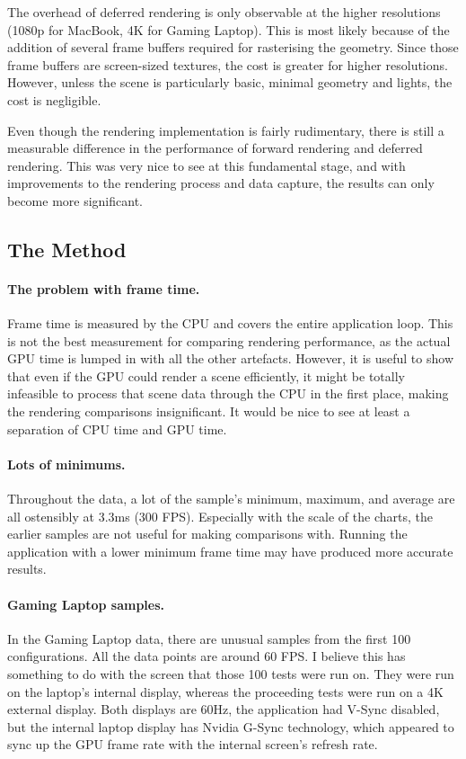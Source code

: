 \documentclass[11pt]{article}
\begin{document}
The overhead of deferred rendering is only observable at the higher resolutions (1080p for MacBook, 4K for Gaming Laptop).
This is most likely because of the addition of several frame buffers required for rasterising the geometry.
Since those frame buffers are screen-sized textures, the cost is greater for higher resolutions.
However, unless the scene is particularly basic, minimal geometry and lights, the cost is negligible.

Even though the rendering implementation is fairly rudimentary, there is still a measurable difference in the performance of forward rendering and deferred rendering.
This was very nice to see at this fundamental stage, and with improvements to the rendering process and data capture, the results can only become more significant.

\subsection{The Method}

\paragraph{The problem with frame time.}
Frame time is measured by the CPU and covers the entire application loop.
This is not the best measurement for comparing rendering performance, as the actual GPU time is lumped in with all the other artefacts.
However, it is useful to show that even if the GPU could render a scene efficiently, it might be totally infeasible to process that scene data through the CPU in the first place, making the rendering comparisons insignificant.
It would be nice to see at least a separation of CPU time and GPU time.

\paragraph{Lots of minimums.}
Throughout the data, a lot of the sample's minimum, maximum, and average are all ostensibly at 3.3ms (300 FPS).
Especially with the scale of the charts, the earlier samples are not useful for making comparisons with.
Running the application with a lower minimum frame time may have produced more accurate results.

\paragraph{Gaming Laptop samples.}
In the Gaming Laptop data, there are unusual samples from the first 100 configurations.
All the data points are around 60 FPS\@.
I believe this has something to do with the screen that those 100 tests were run on.
They were run on the laptop's internal display, whereas the proceeding tests were run on a 4K external display.
Both displays are 60Hz, the application had V-Sync disabled, but the internal laptop display has Nvidia G-Sync technology, which appeared to sync up the GPU frame rate with the internal screen's refresh rate.
\end{document}
